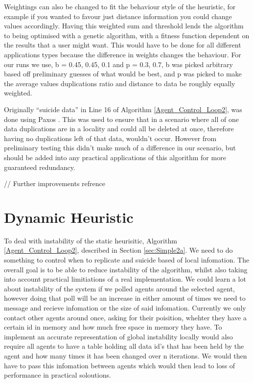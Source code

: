\documentclass{UoYCSproject}
\begin{document}
Weightings can also be changed to fit the behaviour style of the heuristic, for example if you wanted to favour just distance information you could change values accordingly. 
Having this weighted sum and threshold lends the algorithm to being optimised with a genetic algorithm, with a fitness function dependent on the results that a user might want. 
This would have to be done for all different applications types because the difference in weights changes the behaviour. 
For our runs we use, b = {0.45, 0.45, 0.1} and p = {0.3, 0.7}, b was picked arbitrary based off preliminary guesses of what would be best, and p was picked to make the average values duplications ratio and distance to data be roughly equally weighted.

Originally “suicide data” in Line 16 of Algorithm \ref{Agent_Control_Loop2}, was done using Paxos \cite{Paxos}. 
This was used to ensure that in a scenario where all of one data duplications are in a locality and could all be deleted at once, therefore having no duplications left of that data, wouldn’t occur. 
However from preliminary testing this didn’t make much of a difference in our scenario, but should be added into any practical applications of this algorithm for more guaranteed redundancy. 

// Further improvements refrence


\section{Dynamic Heuristic}
\label{sec:Simple3}

To deal with instability of the static heurisitic, Algorithm \ref{Agent_Control_Loop2}, described in Section \ref{sec:Simple2a}.
We need to do something to control when to replicate and suicide based of local infomation.
The overall goal is to be able to reduce instability of the algorithm, whilst also taking into account practical limitiations of a real implementation.
We could learn a lot about instability of the system if we polled agents around the selected agent, however doing that poll will be an increase in either amount of times we need to message and recieve infomation or the size of said infomation.
Currently we only contact other agents around once, asking for their poisition, whehter they have a certain id in memory and how much free space in memory they have.
To implement an accurate representation of global instability locally would also require all agents to have a table holding all data id's that has been held by the agent and how many times it has been changed over n iterations.
We would then have to pass this infomation between agents which would then lead to loss of performance in practical soloutions.
\end{document}
